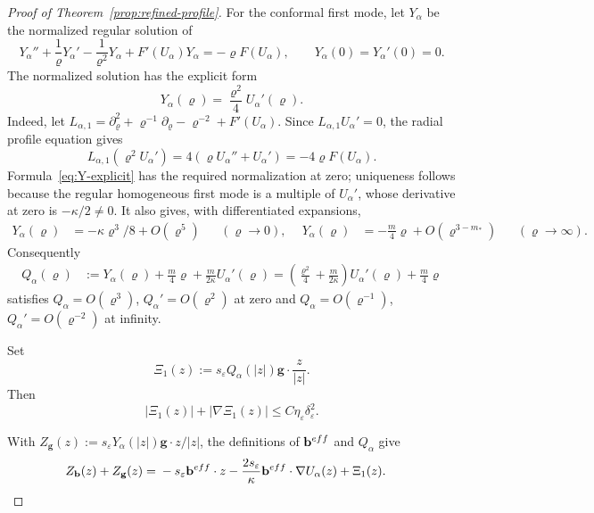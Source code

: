 \documentclass[10pt,a4paper]{amsart}
\numberwithin{equation}{section}
\theoremstyle{definition}
\theoremstyle{remark}
\newcommand{\eps}{\varepsilon}
\newcommand{\etae}{\eta_{\eps}}
\newcommand{\de}{\delta_{\eps}}
\begin{document}
\begin{proof}[Proof of Theorem~\ref{prop:refined-profile}]
{ 
For the conformal first mode, let $Y_\alpha$ be the normalized regular
solution of
\begin{equation}
  Y_\alpha''
  +\frac1{\varrho}Y_\alpha'
  -\frac1{\varrho^2}Y_\alpha
  +F'(U_\alpha)Y_\alpha
  =
  -\varrho F(U_\alpha),
  \qquad
  Y_\alpha(0)=Y_\alpha'(0)=0.
  \label{eq:Y-first-mode}
\end{equation}}
The normalized solution has the explicit form
\begin{equation}\label{eq:Y-explicit}
 Y_\alpha(\varrho)=\frac{\varrho^2}{4}U_\alpha'(\varrho).
\end{equation}
Indeed, let $L_{\alpha,1}=\partial_\varrho^2+
\varrho^{-1}\partial_\varrho-\varrho^{-2}+F'(U_\alpha)$.
Since $L_{\alpha,1}U_\alpha'=0$, the radial profile equation gives
\[
 L_{\alpha,1}(\varrho^2U_\alpha')
 =4(\varrho U_\alpha''+U_\alpha')
 =-4\varrho F(U_\alpha).
\]
Formula~\eqref{eq:Y-explicit} has the required normalization at zero;
uniqueness follows because the regular homogeneous first mode is a
multiple of $U_\alpha'$, whose derivative at zero is $-\kappa/2\ne0$.
It also gives, with differentiated expansions,
\[
 \begin{aligned}
 Y_\alpha(\varrho)&=-\kappa\varrho^3/8+O(\varrho^5)
 &&(\varrho\to0),\quad\
 Y_\alpha(\varrho)&=-\frac m4\varrho+O(\varrho^{3-m_*})
 &&(\varrho\to\infty).
 \end{aligned}
\]
Consequently
\begin{equation}\label{eq:Q-first-mode}
 \begin{aligned}
 Q_\alpha(\varrho)
 &:=Y_\alpha(\varrho)+\frac m4\varrho
       +\frac{m}{2\kappa}U_\alpha'(\varrho) =\left(\frac{\varrho^2}{4}+\frac{m}{2\kappa}\right)
       U_\alpha'(\varrho)+\frac m4\varrho
 \end{aligned}
\end{equation}
satisfies $Q_\alpha=O(\varrho^3)$, $Q_\alpha'=O(\varrho^2)$ at zero
and $Q_\alpha=O(\varrho^{-1})$, $Q_\alpha'=O(\varrho^{-2})$ at infinity.

Set
{ 
\begin{equation}
  \Xi_1(z)
  :=
  s_\eps Q_\alpha(|z|)
  \mathbf{g}\cdot\frac z{|z|}.
  \label{eq:Xi1-definition}
\end{equation}
}
Then
\begin{equation}
  |\Xi_1(z)|+|\nabla\Xi_1(z)|
  \le C\etae\de^2.
  \label{eq:Xi1-bound}
\end{equation}

With $Z_{\mathbf g}(z):=s_\eps Y_\alpha(|z|)\mathbf g\cdot z/|z|$,
the definitions of $\mathbf b^{\rm eff}$ and $Q_\alpha$ give
\begin{align}
  Z_{\mathbf{b}}(z)+Z_{\mathbf{g}}(z)
  ={}&
  -s_\eps \mathbf{b}^{\rm eff}\cdot z
  -\frac{2s_\eps}{\kappa}
   \mathbf{b}^{\rm eff}\cdot\nabla U_\alpha(z)
  +\Xi_1(z).
  \label{eq:first-mode-effective-decomposition}
\end{align}


\end{proof}
\end{document}
